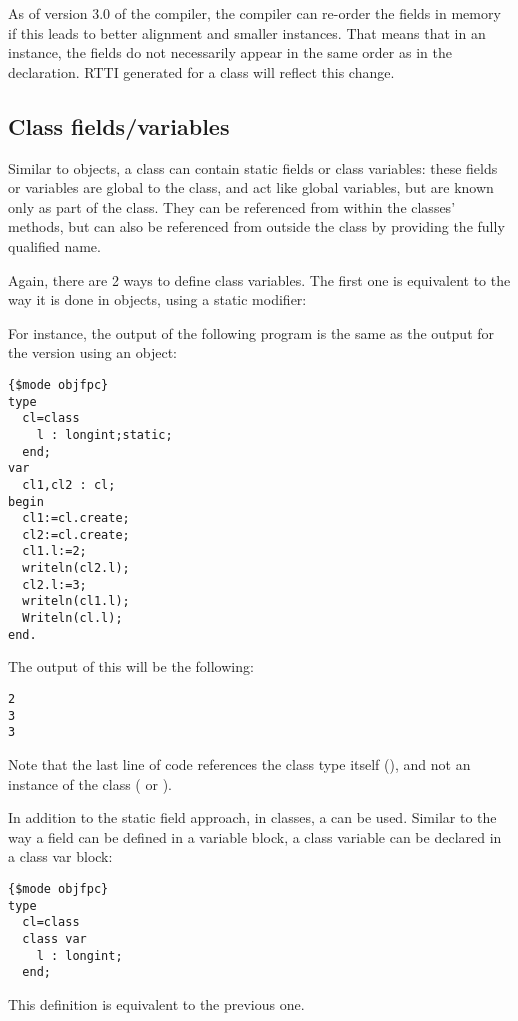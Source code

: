 \begin{remark}
As of version 3.0 of the compiler, the compiler can re-order the fields in memory if this leads to better alignment and smaller instances.
That means that in an instance, the fields do not necessarily appear in the same order as in the declaration. RTTI generated for a class 
will reflect this change.
\end{remark}


\subsection{Class fields/variables}
Similar to objects, a class can contain static fields or class variables: 
these fields or variables are global to the class, and act like global 
variables, but are known only as part of the class. They can be referenced
 from within the classes' methods, but can also be 
referenced from outside the class by providing the fully qualified name.

Again, there are 2 ways to define class variables. The first one is equivalent 
to the way it is done in objects, using a static modifier:

For instance, the output of the following program is the same as the output for
the version using an object:
\begin{verbatim}
{$mode objfpc}
type
  cl=class
    l : longint;static;
  end;
var
  cl1,cl2 : cl;
begin
  cl1:=cl.create;
  cl2:=cl.create;
  cl1.l:=2;
  writeln(cl2.l);
  cl2.l:=3;
  writeln(cl1.l);
  Writeln(cl.l);
end.
\end{verbatim}
The output of this will be the following:
\begin{verbatim}
2
3
3
\end{verbatim}
Note that the last line of code references the class type itself (), 
and not an instance of the class ( or ).

In addition to the static field approach, in classes, a  can be used. 
Similar to the way a field can be defined in a variable block, a class variable can
be declared in a class var block:
\begin{verbatim}
{$mode objfpc}
type
  cl=class
  class var 
    l : longint;
  end;
\end{verbatim}
This definition is equivalent to the previous one.


